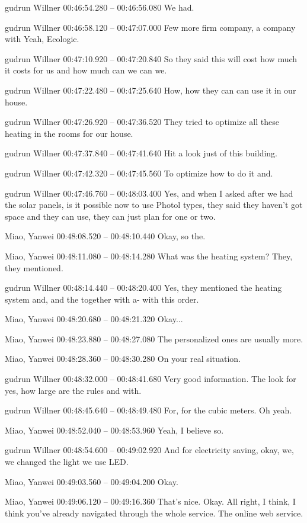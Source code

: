 {gudrun Willner 00:46:54.280 -- 00:46:56.080
We had.

gudrun Willner 00:46:58.120 -- 00:47:07.000
Few more firm company, a company with Yeah, Ecologic.

gudrun Willner 00:47:10.920 -- 00:47:20.840
So they said this will cost how much it costs for us and how much can we can we.

gudrun Willner 00:47:22.480 -- 00:47:25.640
How, how they can can use it in our house.

gudrun Willner 00:47:26.920 -- 00:47:36.520
They tried to optimize all these heating in the rooms for our house.

gudrun Willner 00:47:37.840 -- 00:47:41.640
Hit a look just of this building.

gudrun Willner 00:47:42.320 -- 00:47:45.560
To optimize how to do it and.

gudrun Willner 00:47:46.760 -- 00:48:03.400
Yes, and when I asked after we had the solar panels, is it possible now to use Photol types, they said they haven't got space and they can use, they can just plan for one or two.

Miao, Yanwei 00:48:08.520 -- 00:48:10.440
Okay, so the.

Miao, Yanwei 00:48:11.080 -- 00:48:14.280
What was the heating system? They, they mentioned.

gudrun Willner 00:48:14.440 -- 00:48:20.400
Yes, they mentioned the heating system and, and the together with a- with this order.

Miao, Yanwei 00:48:20.680 -- 00:48:21.320
Okay...

Miao, Yanwei 00:48:23.880 -- 00:48:27.080
The personalized ones are usually more.

Miao, Yanwei 00:48:28.360 -- 00:48:30.280
On your real situation.

gudrun Willner 00:48:32.000 -- 00:48:41.680
Very good information. The look for yes, how large are the rules and with.

gudrun Willner 00:48:45.640 -- 00:48:49.480
For, for the cubic meters. Oh yeah.

Miao, Yanwei 00:48:52.040 -- 00:48:53.960
Yeah, I believe so.

gudrun Willner 00:48:54.600 -- 00:49:02.920
And for electricity saving, okay, we, we changed the light we use LED.

Miao, Yanwei 00:49:03.560 -- 00:49:04.200
Okay.

Miao, Yanwei 00:49:06.120 -- 00:49:16.360
That's nice. Okay. All right, I think, I think you've already navigated through the whole service. The online web service.

}
